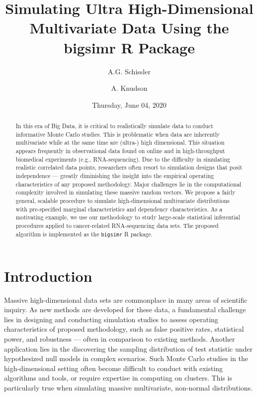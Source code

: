 \documentclass[
]{article}
\title{Simulating Ultra High-Dimensional Multivariate Data Using the bigsimr R Package}
\author{A.G. Schissler \and A. Knudson}
\date{Thursday, June 04, 2020}
\begin{document}
\maketitle
\begin{abstract}
In this era of Big Data, it is critical to realistically simulate data to conduct informative Monte Carlo studies. This is problematic when data are inherently multivariate while at the same time are (ultra-) high dimensional. This situation appears frequently in observational data found on online and in high-throughput biomedical experiments (e.g., RNA-sequencing). Due to the difficulty in simulating realistic correlated data points, researchers often resort to simulation designs that posit independence --- greatly diminishing the insight into the empirical operating characteristics of any proposed methodology. Major challenges lie in the computational complexity involved in simulating these massive random vectors. We propose a fairly general, scalable procedure to simulate high-dimensional multivariate distributions with pre-specified marginal characteristics and dependency characteristics. As a motivating example, we use our methodology to study large-scale statistical inferential procedures applied to cancer-related RNA-sequencing data sets. The proposed algorithm is implemented as the \texttt{bigsimr} R package.
\end{abstract}

{
\setcounter{tocdepth}{3}
\tableofcontents
}
\hypertarget{introduction}{%
\section{Introduction}\label{introduction}}

Massive high-dimensional data sets are commonplace in many areas of scientific inquiry. As new methods are developed for these data, a fundamental challenge lies in designing and conducting simulation studies to assess operating characteristics of proposed methodology, such as false positive rates, statistical power, and robustness --- often in comparison to existing methods. Another application lies in the discovering the sampling distribution of test statistic under hypothesized null models in complex scenarios. Such Monte Carlo studies in the high-dimensional setting often become difficult to conduct with existing algorithms and tools, or require expertise in computing on clusters. This is particularly true when simulating massive multivariate, non-normal distributions.
\end{document}

